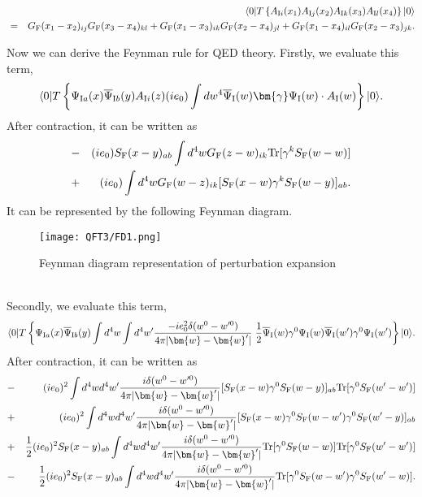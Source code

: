 \begin{example}
\begin{eqnarray}
&& \langle 0 | T \left\{ A_{{\rm I}i}(x_1) A_{{\rm I}j}(x_2) A_{{\rm I}k}(x_3) A_{{\rm I}l}(x_4)\right\}| 0 \rangle \nonumber \\
&=&  G_{\rm F}(x_1-x_2)_{ij} G_{\rm F}(x_3-x_4)_{kl} + G_{\rm F}(x_1-x_3)_{ik}G_{\rm F}(x_2-x_4)_{jl} +  G_{\rm F}(x_1-x_4)_{il}G_{\rm F}(x_2-x_3)_{jk} .\nonumber
\end{eqnarray}
\end{example}
\noindent
Now we can derive the Feynman rule for QED theory.
Firstly, we evaluate this term,
\[\langle 0 | T \left\{ \Psi_{{\rm I}a}(x) \overline{\Psi}_{{\rm I}b}(y) A_{{\rm I}i}(z) (i e_0) \int dw^4 \overline{\Psi}_{\rm I}(w) \bm{\gamma} \Psi_{\rm I}(w) \cdot A_{\rm I}(w) \right\} | 0 \rangle.\]
After contraction, it can be written as
\begin{eqnarray}
&-&  (ie_0) S_{\rm F}(x-y)_{ab} \int d^4 w G_{\rm F}(z-w)_{ik} \mathrm{Tr}[\gamma^k S_{\rm F}(w-w)] \nonumber \\
&+&  (ie_0) \int d^4 w G_{\rm F}(w-z)_{ik}  [S_{\rm F}(x-w) \gamma^k S_{\rm F}(w-y)]_{ab}  .\nonumber
\end{eqnarray}
It can be represented by the following Feynman diagram.
\begin{figure}[!h]
\centering
\texttt{[image: QFT3/FD1.png]}
\caption{Feynman diagram representation of perturbation expansion}
\end{figure}
\\
Secondly, we evaluate this term,
\[\langle 0 | T \left\{ \Psi_{{\rm I}a}(x) \overline{\Psi}_{{\rm I}b}(y) \int d^4w \int d^4w' \frac{-ie_0^2\delta(w^0-w'^0)}{4\pi|\bm{w}-\bm{w}'|}\; \frac{1}{2} \overline{\Psi}_{\rm I}(w)\gamma^0 \Psi_{\rm I}(w) \overline{\Psi}_{\rm I}(w')\gamma^0 \Psi_{\rm I}(w') \right\} | 0 \rangle.\]
After contraction, it can be written as
\begin{eqnarray}
&-&  (ie_0)^2 \int d^4w d^4w' \frac{i\delta(w^0-w'^0)}{4\pi|\bm{w}-\bm{w}'|} [S_{\rm F}(x-w)\gamma^0 S_{\rm F}(w-y)]_{ab} \mathrm{Tr}[\gamma^0 S_{\rm F}(w'-w')] \nonumber \\
&+&  (ie_0)^2 \int d^4w d^4w' \frac{i\delta(w^0-w'^0)}{4\pi|\bm{w}-\bm{w}'|} [S_{\rm F}(x-w)\gamma^0 S_{\rm F}(w-w') \gamma^0 S_{\rm F}(w'-y)]_{ab} \nonumber \\
&+& \frac{1}{2} (ie_0)^2 S_{\rm F}(x-y)_{ab} \int d^4w d^4w' \frac{i\delta(w^0-w'^0)}{4\pi|\bm{w}-\bm{w}'|} \mathrm{Tr}[\gamma^0 S_{\rm F}(w-w)] \mathrm{Tr}[\gamma^0 S_{\rm F}(w'-w')] \nonumber \\
&-& \frac{1}{2} (ie_0)^2 S_{\rm F}(x-y)_{ab} \int d^4w d^4w' \frac{i\delta(w^0-w'^0)}{4\pi|\bm{w}-\bm{w}'|} \mathrm{Tr}[\gamma^0 S_{\rm F}(w-w')\gamma^0 S_{\rm F}(w'-w)] .\nonumber
\end{eqnarray}
